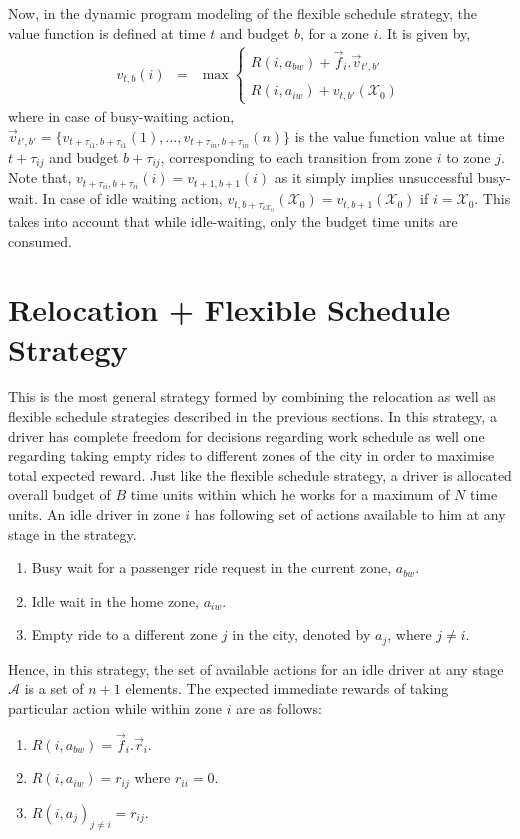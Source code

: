 Now, in the dynamic program modeling of the flexible schedule strategy, the value function is defined at time $t$ and budget $b$, for a zone $i$. It is given by,
\begin{eqnarray*}
v_{t,b}(i) &=& \max
    \begin{cases}
    R(i, a_{bw}) + \vec{f}_i.\vec{v}_{t',b'} \\ \\
    R(i, a_{iw}) + v_{t,b'}(\mathcal{X}_0)
    \end{cases}
\end{eqnarray*}
where in case of busy-waiting action, $\vec{v}_{t',b'} = \{v_{t + \tau_{i1}, b + \tau_{i1}}(1), ..., v_{t + \tau_{in}, b + \tau_{in}}(n)\}$ is the value function value at time $t + \tau_{ij}$ and budget $b + \tau_{ij}$, corresponding to each transition from zone $i$ to zone $j$. Note that, $v_{t + \tau_{ii}, b + \tau_{ii}}(i) = v_{t+1, b+1}(i)$ as it simply implies unsuccessful busy-wait. In case of idle waiting action, $v_{t, b + \tau_{i\mathcal{X}_0}}(\mathcal{X}_0) = v_{t, b+1}(\mathcal{X}_0)$ if $i = \mathcal{X}_0$. This takes into account that while idle-waiting, only the budget time units are consumed.

\section{Relocation + Flexible Schedule Strategy}
This is the most general strategy formed by combining the relocation as well as flexible schedule strategies described in the previous sections. In this strategy, a driver has complete freedom for decisions regarding work schedule as well one regarding taking empty rides to different zones of the city in order to maximise total expected reward. Just like the flexible schedule strategy, a driver is allocated overall budget of $B$ time units within which he works for a maximum of $N$ time units. An idle driver in zone $i$ has following set of actions available to him at any stage in the strategy.
\begin{enumerate}
    \item Busy wait for a passenger ride request in the current zone, $a_{bw}$.
    \item Idle wait in the home zone, $a_{iw}$.
    \item Empty ride to a different zone $j$ in the city, denoted by $a_j$, where $j \neq i$.
\end{enumerate}
Hence, in this strategy, the set of available actions for an idle driver at any stage $\mathcal{A}$ is a set of $n+1$ elements. The expected immediate rewards of taking particular action while within zone $i$ are as follows:
\begin{enumerate}
    \item $R(i, a_{bw}) = \vec{f}_i.\vec{r}_i$.
    \item $R(i, a_{iw}) = r_{ij}$ where $r_{ii} = 0$.
    \item $R(i, a_j)_{j \neq i} = r_{ij}$.
\end{enumerate}

